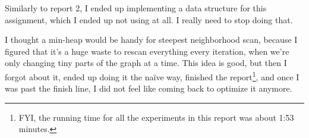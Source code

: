 \documentclass[14pt]{article}
\begin{document}
\vspace{4mm}
\noindent
Similarly to report 2, I ended up implementing a data structure for this
assignment, which I ended up not using at all. I really need to stop doing
that.

I thought a min-heap would be handy for steepest neighborhood scan, because I
figured that it's a huge waste to rescan everything every iteration, when we're
only changing tiny parts of the graph at a time. This idea is good, but then I
forgot about it, ended up doing it the naïve way, finished the
report\footnote{FYI, the running time for all the experiments in this report
was about 1:53 minutes.}, and once I was past the finish line, I did not feel
like coming back to optimize it anymore.
\end{document}
